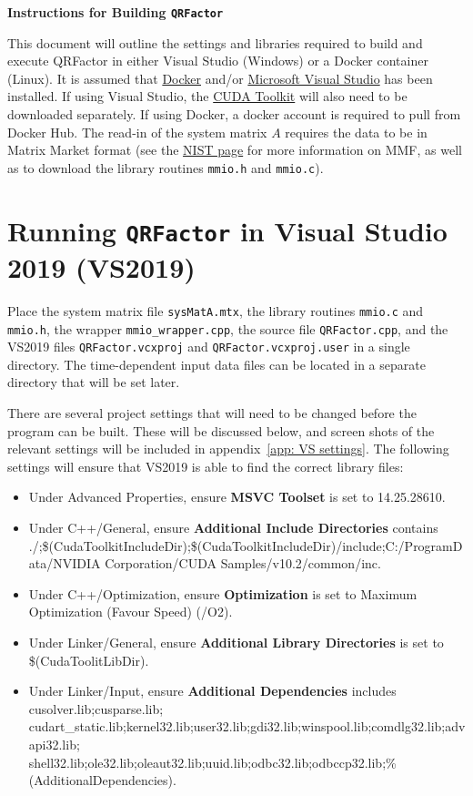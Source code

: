 \documentclass[11pt,letterpaper]{article}
\begin{document}
\begin{center}
  {\Large \bf Instructions for Building \texttt{QRFactor}}
\end{center}

This document will outline the settings and libraries required to build and 
execute QRFactor in either Visual Studio (Windows) or a Docker container (Linux). 
It is assumed that \href{https://docs.docker.com/get-docker/}{Docker} and/or 
\href{https://visualstudio.microsoft.com/downloads/}{Microsoft Visual Studio} has 
been installed. If using Visual Studio, the \href{https://developer.nvidia.com/cuda-downloads}{CUDA Toolkit}
will also need to be downloaded separately. If using Docker, a docker account is required
to pull from Docker Hub.
The read-in of the system matrix $A$ requires the data to be in Matrix Market format 
(see the \href{https://math.nist.gov/MatrixMarket/formats.html}{NIST page} for more
information on MMF, as well as to download the library routines \texttt{mmio.h} 
and \texttt{mmio.c}).

\section{Running \texttt{QRFactor} in Visual Studio 2019 (VS2019)}
\label{sec: vs}

Place the system matrix file \texttt{sysMatA.mtx}, the library routines \texttt{mmio.c} and \texttt{mmio.h}, the wrapper \texttt{mmio\_wrapper.cpp}, the source file \texttt{QRFactor.cpp}, and the VS2019 files \texttt{QRFactor.vcxproj} and \texttt{QRFactor.vcxproj.user} in a single directory. The time-dependent input data files can be located in a separate directory that will be set later.

There are several project settings that will need to be changed before the program can be built. These will be discussed below, and screen shots of the relevant settings will be included in appendix~\ref{app: VS settings}. The following settings will ensure that VS2019 is able to find the correct library files:
\begin{itemize}
\item Under Advanced Properties, ensure {\bf MSVC Toolset} is set to 14.25.28610.
\item Under C++/General, ensure {\bf Additional Include Directories} contains ./;\$(CudaToolkitIncludeDir);\$(CudaToolkitIncludeDir)/include;C:/ProgramData/NVIDIA Corporation/CUDA Samples/v10.2/common/inc.
\item Under C++/Optimization, ensure {\bf Optimization} is set to Maximum Optimization (Favour Speed) (/O2).
\item Under Linker/General, ensure {\bf Additional Library Directories} is set to \$(CudaToolitLibDir).
\item Under Linker/Input, ensure {\bf Additional Dependencies} includes cusolver.lib;cusparse.lib; cudart\_static.lib;kernel32.lib;user32.lib;gdi32.lib;winspool.lib;comdlg32.lib;advapi32.lib; \\ shell32.lib;ole32.lib;oleaut32.lib;uuid.lib;odbc32.lib;odbccp32.lib;\%(AdditionalDependencies).
\end{itemize}
\end{document}
